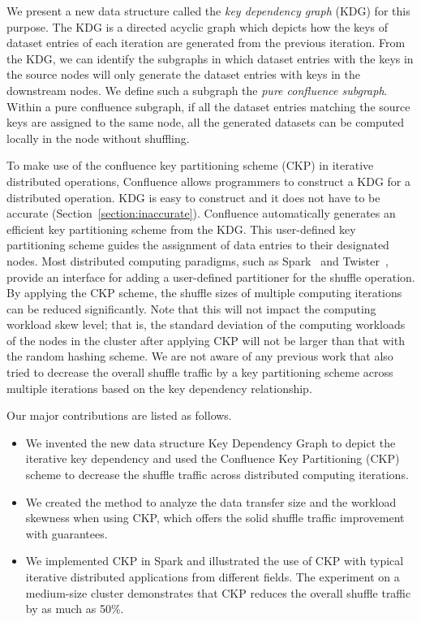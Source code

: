 \documentclass[10pt,journal,compsoc]{IEEEtran}
\begin{document}
We present a new data structure called the \emph{key dependency graph} (KDG) for this purpose.
The KDG is a directed acyclic graph which depicts how the keys of
dataset entries of each iteration are generated from the previous iteration.
From the KDG, we can identify the subgraphs in which dataset
entries with the keys in the source nodes will only generate the dataset
entries with keys in the downstream nodes. We define such a subgraph
the \emph{pure confluence subgraph}.
Within a pure confluence subgraph, if all the dataset entries matching
the source keys are assigned to the same node, all the generated
datasets can be computed locally in the node without shuffling.

To make use of the confluence key partitioning scheme (CKP) in iterative distributed operations, 
Confluence allows programmers to construct a KDG for a distributed operation. 
KDG is easy to construct and it does not have to be accurate (Section~\ref{section:inaccurate}). 
Confluence automatically generates an efficient key partitioning 
scheme from the KDG. 
This user-defined key partitioning scheme guides the assignment of data entries 
to their designated nodes. 
Most distributed computing paradigms, such as Spark~\cite{zaharia2012resilient} and Twister~\cite{ekanayake2010twister},
provide an interface for adding a user-defined partitioner for the shuffle
operation.
By applying the CKP scheme, the shuffle sizes of multiple computing
iterations can be reduced significantly. %
Note that this will not impact the computing workload skew level; that is,
the standard deviation of the computing workloads of the
nodes in the cluster after applying CKP will not be larger than that
with the random hashing scheme.
We are not aware of any previous work
that also tried to decrease the overall
shuffle traffic by a key partitioning scheme across multiple
iterations based on the
key dependency relationship.

Our major contributions are listed as follows.
\begin{itemize}
\setlength{\itemsep}{0pt}
\setlength{\parskip}{0pt}
\setlength{\parsep}{0pt}
\item We invented the new data structure Key Dependency Graph to depict the iterative key dependency
and used the Confluence Key Partitioning (CKP) scheme to decrease the shuffle traffic
across distributed computing iterations.

\item We created the method to analyze the data transfer size and the workload skewness when using CKP, which offers the solid shuffle traffic improvement with guarantees. 

\item We implemented CKP in Spark and illustrated the use of CKP with typical iterative distributed applications from different fields. 
The experiment on a medium-size cluster demonstrates that CKP reduces the overall shuffle traffic by as much as 50\%.  
\end{itemize}
\end{document}
